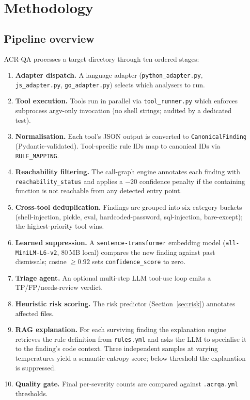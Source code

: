 \documentclass[conference]{IEEEtran}
\begin{document}
\section{Methodology}
\label{sec:methodology}

\subsection{Pipeline overview}

ACR-QA processes a target directory through ten ordered stages:

\begin{enumerate}
  \item \textbf{Adapter dispatch.} A language adapter
        (\texttt{python\_adapter.py}, \texttt{js\_adapter.py},
        \texttt{go\_adapter.py}) selects which analysers to run.
  \item \textbf{Tool execution.} Tools run in parallel via
        \texttt{tool\_runner.py} which enforces subprocess argv-only
        invocation (no shell strings; audited by a dedicated test).
  \item \textbf{Normalisation.} Each tool's JSON output is converted to
        \texttt{CanonicalFinding} (Pydantic-validated). Tool-specific
        rule IDs map to canonical IDs via \texttt{RULE\_MAPPING}.
  \item \textbf{Reachability filtering.} The call-graph engine annotates
        each finding with \texttt{reachability\_status} and applies a
        $-20$ confidence penalty if the containing function is not
        reachable from any detected entry point.
  \item \textbf{Cross-tool deduplication.} Findings are grouped into six
        category buckets (shell-injection, pickle, eval, hardcoded-password,
        sql-injection, bare-except); the highest-priority tool wins.
  \item \textbf{Learned suppression.} A \texttt{sentence-transformer}
        embedding model (\texttt{all-MiniLM-L6-v2}, 80\,MB local) compares
        the new finding against past dismissals; cosine $\geq 0.92$ sets
        \texttt{confidence\_score} to zero.
  \item \textbf{Triage agent.} An optional multi-step LLM tool-use loop
        emits a TP/FP/needs-review verdict.
  \item \textbf{Heuristic risk scoring.} The risk predictor
        (Section~\ref{sec:risk}) annotates affected files.
  \item \textbf{RAG explanation.} For each surviving finding the
        explanation engine retrieves the rule definition from
        \texttt{rules.yml} and asks the LLM to specialise it to the
        finding's code context. Three independent samples at varying
        temperatures yield a semantic-entropy score; below threshold the
        explanation is suppressed.
  \item \textbf{Quality gate.} Final per-severity counts are compared
        against \texttt{.acrqa.yml} thresholds.
\end{enumerate}
\end{document}
